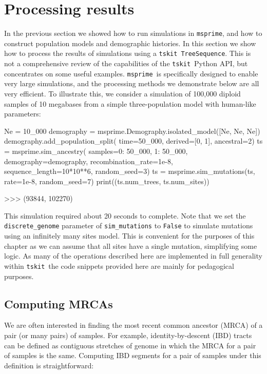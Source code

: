 \documentclass[graybox]{svmult}
\newcommand{\msprime}[0]{\texttt{msprime}}
\newcommand{\tskit}[0]{\texttt{tskit}}
\begin{document}
\section{Processing results}\label{processing-results}

In the previous section we showed how to run simulations in \msprime, and
how to construct population models and demographic histories. In this
section we show how to process the results of simulations using
a \tskit\ \texttt{TreeSequence}. This is not a
comprehensive review of the capabilities of the \tskit\ Python API, but
concentrates on some useful examples.
\msprime\ is specifically designed to enable very large simulations, and
the processing methods we demonstrate below are all very efficient. To
illustrate this, we consider a simulation of 100,000 diploid samples of 10 megabases
from a simple three-population model with human-like parameters:

\begin{pythoncode}
Ne = 10_000
demography = msprime.Demography.isolated_model([Ne, Ne, Ne])
demography.add_population_split(
    time=50_000, derived=[0, 1], ancestral=2)
ts = msprime.sim_ancestry(
    samples={0: 50_000, 1: 50_000},
    demography=demography, recombination_rate=1e-8,
    sequence_length=10*10**6, random_seed=3)
ts = msprime.sim_mutations(ts, rate=1e-8, random_seed=7)
print((ts.num_trees, ts.num_sites))

>>> (93844, 102270)
\end{pythoncode}

This simulation required about 20 seconds to complete. Note that we set the
\texttt{discrete\_genome} parameter of \texttt{sim\_mutations} to
\texttt{False} to simulate mutations using an infinitely many sites model.
This is convenient for the purposes of this chapter as we can assume
that all sites have a single mutation, simplifying some logic. As many
of the operations described here are implemented in full generality
within \tskit\, the code snippets provided here are mainly for pedagogical
purposes.

\subsection{Computing MRCAs}\label{computing-mrcas}
We are often interested in finding the most recent common ancestor (MRCA)
of a pair (or many pairs) of samples. For example, identity-by-descent
(IBD) tracts can be defined as contiguous stretches of genome in which the
MRCA for a pair of samples is the same. Computing IBD segments for a
pair of samples under this definition is straightforward:
\end{document}
